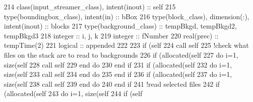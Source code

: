 \begin{DoxyCode}
214     \textcolor{keywordtype}{class}(input\_streamer\_class), \textcolor{keywordtype}{intent(inout)} :: self
215     \textcolor{keywordtype}{type}(boundingbox\_class), \textcolor{keywordtype}{intent(in)} :: bBox
216     \textcolor{keywordtype}{type}(block\_class), \textcolor{keywordtype}{dimension(:)}, \textcolor{keywordtype}{intent(inout)} :: blocks
217     \textcolor{keywordtype}{type}(background\_class) :: tempBkgd, tempBkgd2, tempBkgd3
218     \textcolor{keywordtype}{integer} :: i, j, k
219     \textcolor{keywordtype}{integer} :: fNumber
220     \textcolor{keywordtype}{real(prec)} :: tempTime(2)
221     \textcolor{keywordtype}{logical} :: appended
222 
223     \textcolor{keywordflow}{if} (self%
224         \textcolor{keyword}{call }self%
225         \textcolor{comment}{!check what files on the stack are to read to backgrounds}
226         \textcolor{keywordflow}{if} (\textcolor{keyword}{allocated}(self%
227             \textcolor{keywordflow}{do} i=1, \textcolor{keyword}{size}(self%
228                 \textcolor{keyword}{call }self%
229 \textcolor{keywordflow}{            end do}
230 \textcolor{keywordflow}{        end if}
231         \textcolor{keywordflow}{if} (\textcolor{keyword}{allocated}(self%
232             \textcolor{keywordflow}{do} i=1, \textcolor{keyword}{size}(self%
233                 \textcolor{keyword}{call }self%
234 \textcolor{keywordflow}{            end do}
235 \textcolor{keywordflow}{        end if}
236         \textcolor{keywordflow}{if} (\textcolor{keyword}{allocated}(self%
237             \textcolor{keywordflow}{do} i=1, \textcolor{keyword}{size}(self%
238                 \textcolor{keyword}{call }self%
239 \textcolor{keywordflow}{            end do}
240 \textcolor{keywordflow}{        end if}
241         \textcolor{comment}{!read selected files}
242         \textcolor{keywordflow}{if} (\textcolor{keyword}{allocated}(self%
243             \textcolor{keywordflow}{do} i=1, \textcolor{keyword}{size}(self%
244                 \textcolor{keywordflow}{if} (self%

\end{DoxyCode}
